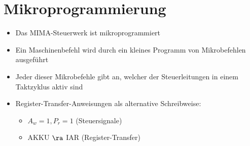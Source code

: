 \documentclass{kit}
\begin{document}
\section{Mikroprogrammierung}
  \begin{itemize}
    \item Das MIMA-Steuerwerk ist mikroprogrammiert
    \item Ein Maschinenbefehl wird durch ein kleines Programm von Mikrobefehlen ausgeführt
    \item Jeder dieser Mikrobefehle gibt an, welcher der Steuerleitungen in einem Taktzyklus aktiv sind
    \item Register-Transfer-Anweisungen als alternative Schreibweise:
      \begin{itemize}
        \item $A_w=1,P_r=1$ (Steuersignale)
        \item AKKU $\ra$ IAR (Register-Transfer)
      \end{itemize}
  \end{itemize}
\end{document}

